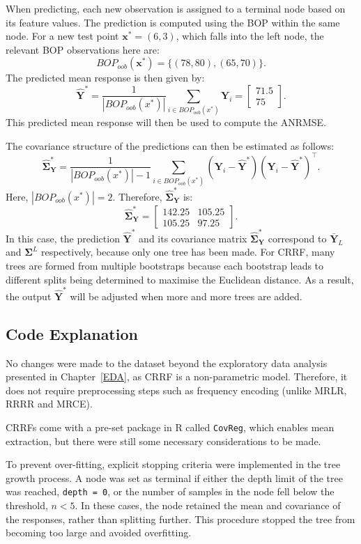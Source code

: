 \documentclass[11pt]{report} %
\begin{document}
When predicting, each new observation is assigned to a terminal node based on its feature values. The prediction is computed using the BOP within the same node. For a new test point \( \mathbf{x}^* = (6,3) \), which falls into the left node, the relevant BOP observations here are: 
\[
BOP_{oob}(\mathbf{x}^*) = \{(78,80), (65,70)\}.
\]
The predicted mean response is then given by:
\[
\mathbf{\hat{Y}}^* = \frac{1}{|BOP_{oob}(x^*)|} \sum_{i \in BOP_{oob}(x^*)} \mathbf{Y}_i = 
\begin{bmatrix} 
71.5 \\ 
75 
\end{bmatrix}.
\]
This predicted mean response will then be used to compute the ANRMSE.

\noindent The covariance structure of the predictions can then be estimated as follows:
\[
\mathbf{\hat{\Sigma}}^*_\mathbf{Y} = \frac{1}{|BOP_{oob}(x^*)| - 1} \sum_{i \in BOP_{oob}(x^*)} (\mathbf{Y}_i - \mathbf{\hat{Y}}^*)(\mathbf{Y}_i - \mathbf{\hat{Y}}^*)^\top.
\]
Here, $|BOP_{oob}(x^*)| = 2$. Therefore, $\mathbf{\hat{\Sigma}}^*_\mathbf{Y}$ is:
\[
\mathbf{\hat{\Sigma}}^*_\mathbf{Y} = 
\begin{bmatrix} 
142.25 & 105.25 \\ 
105.25 & 97.25 
\end{bmatrix}.
\]
In this case, the prediction $\mathbf{\hat{Y}^*}$ and its covariance matrix $\mathbf{\hat{\Sigma}}^*_\mathbf{Y}$ correspond to $\mathbf{\bar{Y}}_L$ and $\mathbf{\Sigma}^L$ respectively, because only one tree has been made. For CRRF, many trees are formed from multiple bootstraps because each bootstrap leads to different splits being determined to maximise the Euclidean distance. As a result, the output $\mathbf{\hat{Y}^*}$ will be adjusted when more and more trees are added.

\subsection{Code Explanation}
\label{CRRF Code}
No changes were made to the dataset beyond the exploratory data analysis presented in Chapter~\ref{EDA}, as CRRF is a non-parametric model. Therefore, it does not require preprocessing steps such as frequency encoding (unlike MRLR, RRRR and MRCE).

CRRFs come with a pre-set package in R called \texttt{CovReg}, which enables mean extraction, but there were still some necessary considerations to be made.

To prevent over-fitting, explicit stopping criteria were implemented in the tree growth process. A node was set as terminal if either the depth limit of the tree was reached, \texttt{depth = 0}, or the number of samples in the node fell below the threshold, $n < 5$. In these cases, the node retained the mean and covariance of the responses, rather than splitting further. This procedure stopped the tree from becoming too large and avoided overfitting.
\end{document}
